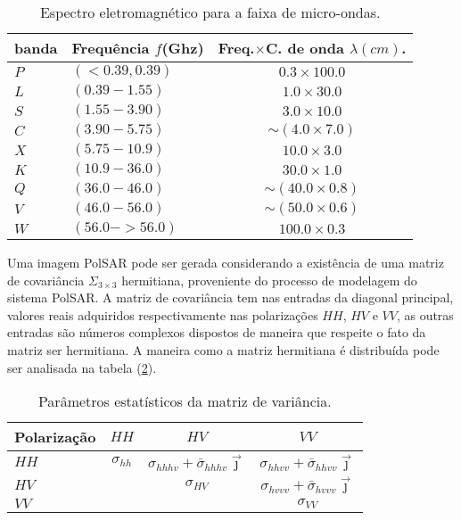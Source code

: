 \begin{table}[hbt]
	\centering
	\caption{Espectro eletromagnético para a faixa de micro-ondas.}\label{cap_acf_tab03}
\begin{tabular}{@{}llc@{}} \toprule
	banda & Frequência $f$(\si{Ghz}) & Freq.$\times$C. de onda $\lambda(cm)$. \\\midrule
	$P$&$(<0.39, 0.39)$  & $0.3\times 100.0$  \\ 
	$L$&$(0.39-1.55)$  &  $1.0\times 30.0$\\ 
	$S$&$(1.55-3.90)$  &  $3.0\times 10.0$\\ 
	$C$&$(3.90-5.75)$  & $\sim(4.0\times 7.0)$ \\ 
	$X$&$(5.75-10.9)$  & $10.0\times 3.0$ \\ 
	$K$&$(10.9-36.0)$  & $30.0\times 1.0$ \\ 
	$Q$&$(36.0-46.0)$  & $\sim(40.0\times 0.8 )$ \\ 
	$V$&$(46.0-56.0)$  & $\sim(50.0\times 0.6)$ \\ 
	$W$&$(56.0- >56.0)$  & $100.0\times 0.3$ \\ \bottomrule 
\end{tabular}
\end{table}
%

Uma imagem PolSAR pode ser gerada considerando a existência de uma matriz de covariância $\Sigma_{3\times3}$ hermitiana, proveniente do processo de modelagem do sistema PolSAR. A matriz de covariância tem nas entradas da diagonal principal, valores reais adquiridos respectivamente nas polarizações $HH$, $HV$ e $VV$, as outras entradas são números complexos dispostos de maneira que respeite o fato da matriz ser hermitiana. A maneira como a matriz hermitiana é distribuída pode ser analisada na tabela (\ref{cap_acf_tab04}).
\begin{table}[hbt]
	\centering
	\caption{Parâmetros estatísticos da matriz de variância.}\label{cap_acf_tab04}
\begin{tabular}{@{}lccc@{}} \toprule
	Polarização & $HH$  & $HV$ & $VV$ \\ \midrule
	$HH$ & $\sigma_{hh}$ & $\sigma_{hhhv} + \bar{\sigma}_{hhhv}\vec{\jmath}$  & $\sigma_{hhvv} + \bar{\sigma}_{hhvv}\vec{\jmath}$\\ 
	$HV$ & &$\sigma_{HV}$ & $\sigma_{hvvv} + \bar{\sigma}_{hvvv}\vec{\jmath}$\\ 
	$VV$ & & &$\sigma_{VV}$ \\ \bottomrule 
\end{tabular}
\end{table}

